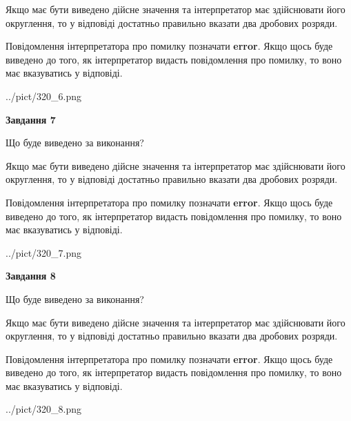 \documentclass[12pt, ukrainian]{article}
\begin{document}
{\begin {Large}
Якщо має бути виведено дійсне значення та інтерпретатор має здійснювати його округлення, 
то у відповіді достатньо правильно вказати два дробових розряди.

Повідомлення інтерпретатора про помилку позначати \textbf{error}.
Якщо щось буде виведено до того, як інтерпретатор видасть повідомлення про помилку, 
то воно має вказуватись у відповіді. \par

\begin{center}
	{../pict/320_6.png}
\end{center}
\newpage

{\begin {center}\textbf{Завдання 7}\end {center}}\par
Що буде виведено за виконання? \par

Якщо має бути виведено дійсне значення та інтерпретатор має здійснювати його округлення, 
то у відповіді достатньо правильно вказати два дробових розряди.

Повідомлення інтерпретатора про помилку позначати \textbf{error}.
Якщо щось буде виведено до того, як інтерпретатор видасть повідомлення про помилку, 
то воно має вказуватись у відповіді. \par

\begin{center}
	{../pict/320_7.png}
\end{center}
\newpage

{\begin {center}\textbf{Завдання 8}\end {center}}\par
Що буде виведено за виконання? \par

Якщо має бути виведено дійсне значення та інтерпретатор має здійснювати його округлення, 
то у відповіді достатньо правильно вказати два дробових розряди.

Повідомлення інтерпретатора про помилку позначати \textbf{error}.
Якщо щось буде виведено до того, як інтерпретатор видасть повідомлення про помилку, 
то воно має вказуватись у відповіді. \par

\begin{center}
	{../pict/320_8.png}
\end{center}
\newpage


\end{Large}}
\end{document}
